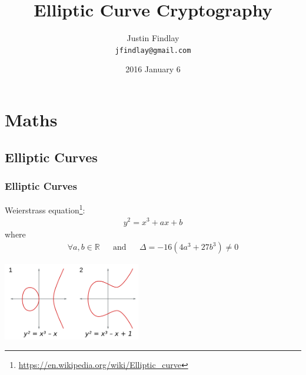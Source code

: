 \documentclass{beamer}
\title{Elliptic Curve Cryptography}
\author{Justin Findlay \\ \texttt{jfindlay@gmail.com}}
\date[SLC Python]{2016 January 6}
\begin{document}
\maketitle

\section{Maths}

\subsection{Elliptic Curves}

\begin{frame}
\frametitle{Elliptic Curves}
Weierstrass equation\footnote{\url{https://en.wikipedia.org/wiki/Elliptic_curve}}:
\begin{align*}
  y^2 = x^3 + ax + b
\end{align*}
where
\begin{align*}
  \forall a,b \in \mathbb R && \text{and} && \Delta = -16(4a^3 + 27b^3) \not= 0
\end{align*}
\begin{center}
  \includegraphics[width=6cm]{elliptic_curves.png}
\end{center}
\end{frame}
\end{document}
